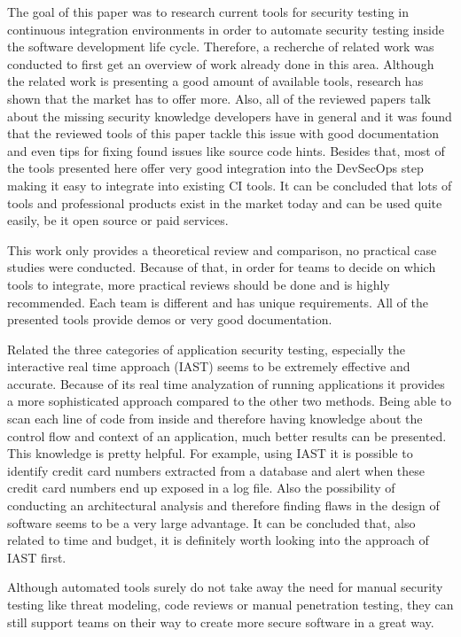 \documentclass[conference]{IEEEtran}
\begin{document}
The goal of this paper was to research current tools for security testing in continuous integration environments in order to automate security testing inside the software development life cycle. Therefore, a recherche of related work was conducted to first get an overview of work already done in this area. Although the related work is presenting a good amount of available tools, research has shown that the market has to offer more. Also, all of the reviewed papers talk about the missing security knowledge developers have in general and it was found that the reviewed tools of this paper tackle this issue with good documentation and even tips for fixing found issues like source code hints. Besides that, most of the tools presented here offer very good integration into the DevSecOps step making it easy to integrate into existing CI tools. It can be concluded that lots of tools and professional products exist in the market today and can be used quite easily, be it open source or paid services.

This work only provides a theoretical review and comparison, no practical case studies were conducted. Because of that, in order for teams to decide on which tools to integrate, more practical reviews should be done and is highly recommended. Each team is different and has unique requirements. All of the presented tools provide demos or very good documentation.

Related the three categories of application security testing, especially the interactive real time approach (IAST) seems to be extremely effective and accurate. Because of its real time analyzation of running applications it provides a more sophisticated approach compared to the other two methods. Being able to scan each line of code from inside and therefore having knowledge about the control flow and context of an application, much better results can be presented. This knowledge is pretty helpful. For example, using IAST it is possible to identify credit card numbers extracted from a database and alert when these credit card numbers end up exposed in a log file. Also the possibility of conducting an architectural analysis and therefore finding flaws in the design of software seems to be a very large advantage. It can be concluded that, also related to time and budget, it is definitely worth looking into the approach of IAST first.

Although automated tools surely do not take away the need for manual security testing like threat modeling, code reviews or manual penetration testing, they can still support teams on their way to create more secure software in a great way.




\end{document}
